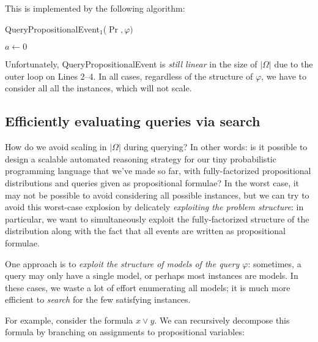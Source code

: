 \documentclass{tufte-handout}
\begin{document}
This is implemented by the following algorithm:

\begin{algorithm}
    \caption{QueryPropositionalEvent$_1$($\Pr, \varphi)$}
    $a \leftarrow 0$\;
    \label{alg:enum}
\end{algorithm}


Unfortunately, QueryPropositionalEvent is \emph{still linear} in the size of
$|\Omega|$ due to the outer loop on Lines 2--4.  In all cases, regardless of the
structure of $\varphi$, we have to consider all all the instances, which will
not scale. 

\subsection{Efficiently evaluating queries via search}
How do we avoid scaling in $|\Omega|$ during querying? 
In other words: is it possible to design a scalable automated reasoning strategy 
for our tiny probabilistic programming language that we've made so far, with fully-factorized 
propositional distributions and queries given as propositional formulae?
In the worst case, it
may not be possible to avoid considering all possible instances, but we can 
try to avoid this worst-case explosion by delicately \emph{exploiting the problem 
structure}: in particular, we want to simultaneously exploit the fully-factorized 
structure of the distribution along with the fact that all events are written 
as propositional formulae.

One approach is to \emph{exploit the structure of models of the query
$\varphi$}: sometimes, a query may only have a single model, or perhaps most
instances are models. In these cases, we waste a lot of effort enumerating all
models; it is much more efficient to \emph{search} for the few satisfying instances.

For example, consider the formula $x \lor y$. We can recursively decompose this
formula by branching on assignments to propositional variables:

\end{document}
